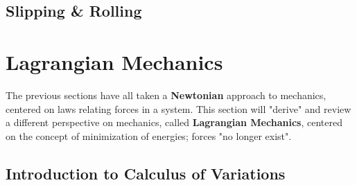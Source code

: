 \documentclass[12pt]{article}
\begin{document}
\subsection{Slipping \& Rolling}

\section{Lagrangian Mechanics}

The previous sections have all taken a \textbf{Newtonian} approach to mechanics, centered on laws relating forces in a system. This section will "derive" and review a different perspective on mechanics, called \textbf{Lagrangian Mechanics}, centered on the concept of minimization of energies; forces "no longer exist".
\subsection{Introduction to Calculus of Variations}
\end{document}
